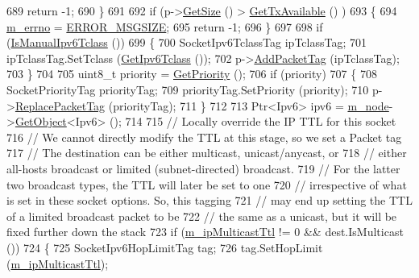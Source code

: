 \begin{DoxyCode}
689       \textcolor{keywordflow}{return} -1;
690     \}
691 
692   \textcolor{keywordflow}{if} (p->\hyperlink{classns3_1_1Packet_a462855c9929954d4301a4edfe55f4f1c}{GetSize} () > \hyperlink{classns3_1_1UdpSocketImpl_a70191d0578ae26233f569631a26d608b}{GetTxAvailable} () )
693     \{
694       \hyperlink{classns3_1_1UdpSocketImpl_ac35998e8aa2cc588e21752944b0a0095}{m\_errno} = \hyperlink{classns3_1_1Socket_ada1328c5ae0c28cb2a982caf8f6d6ccaaeba174dbfeaed34194ce9463f6a469f1}{ERROR\_MSGSIZE};
695       \textcolor{keywordflow}{return} -1;
696     \}
697 
698   \textcolor{keywordflow}{if} (\hyperlink{classns3_1_1Socket_a83858f6116bcdabecf1b63b37514ec8d}{IsManualIpv6Tclass} ())
699     \{
700       SocketIpv6TclassTag ipTclassTag;
701       ipTclassTag.SetTclass (\hyperlink{classns3_1_1Socket_aed62162f0b5f322b1fa23b7350c3c2ce}{GetIpv6Tclass} ());
702       p->\hyperlink{classns3_1_1Packet_a7400b8655852f5271c5957250d0141af}{AddPacketTag} (ipTclassTag);
703     \}
704 
705   uint8\_t priority = \hyperlink{classns3_1_1Socket_a3e4788d61c0e841ccaa1c7fce6fda2c1}{GetPriority} ();
706   \textcolor{keywordflow}{if} (priority)
707     \{
708       SocketPriorityTag priorityTag;
709       priorityTag.SetPriority (priority);
710       p->\hyperlink{classns3_1_1Packet_afb014ae9f4adddbfc51c64b085bfd405}{ReplacePacketTag} (priorityTag);
711     \}
712 
713   Ptr<Ipv6> ipv6 = \hyperlink{classns3_1_1UdpSocketImpl_af6a19247be3d8917b582af77337730c3}{m\_node}->\hyperlink{classns3_1_1Object_a13e18c00017096c8381eb651d5bd0783}{GetObject}<Ipv6> ();
714 
715   \textcolor{comment}{// Locally override the IP TTL for this socket}
716   \textcolor{comment}{// We cannot directly modify the TTL at this stage, so we set a Packet tag}
717   \textcolor{comment}{// The destination can be either multicast, unicast/anycast, or}
718   \textcolor{comment}{// either all-hosts broadcast or limited (subnet-directed) broadcast.}
719   \textcolor{comment}{// For the latter two broadcast types, the TTL will later be set to one}
720   \textcolor{comment}{// irrespective of what is set in these socket options.  So, this tagging}
721   \textcolor{comment}{// may end up setting the TTL of a limited broadcast packet to be}
722   \textcolor{comment}{// the same as a unicast, but it will be fixed further down the stack}
723   \textcolor{keywordflow}{if} (\hyperlink{classns3_1_1UdpSocketImpl_a4849465356cef8573ed373d12a5a62ec}{m\_ipMulticastTtl} != 0 && dest.IsMulticast ())
724     \{
725       SocketIpv6HopLimitTag tag;
726       tag.SetHopLimit (\hyperlink{classns3_1_1UdpSocketImpl_a4849465356cef8573ed373d12a5a62ec}{m\_ipMulticastTtl});

\end{DoxyCode}
